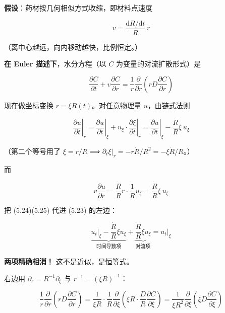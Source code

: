 \textbf{假设}：药材按几何相似方式收缩，即材料点速度


\begin{equation}
v=\frac{\mathrm{d} R/\mathrm{d} t}{R}\,r\tag{5.22}
\end{equation}


（离中心越远，向内移动越快，比例恒定。）


\textbf{在 Euler 描述下}，水分方程（以 $C$ 为变量的对流扩散形式）是


\begin{equation}
\frac{\partial C}{\partial t}+v\frac{\partial C}{\partial r}=\frac1r\frac{\partial}{\partial r}\left(rD\frac{\partial C}{\partial r}\right)\tag{5.23}
\end{equation}


现在做坐标变换 $r=\xi R(t)$。对任意物理量 $u$，由链式法则


\begin{equation}
\left.\frac{\partial u}{\partial t}\right|_{r}
=\left.\frac{\partial u}{\partial t}\right|_{\xi}+u_\xi\cdot\left.\frac{\partial \xi}{\partial t}\right|_{r}
=\left.\frac{\partial u}{\partial t}\right|_{\xi}-\frac{\dot R}{R}\xi\,u_\xi\tag{5.24}
\end{equation}


（第二个等号用了 $\xi=r/R$ ⟹ $\partial_t\xi|_r=-r\dot R/R^2=-\xi\dot R/R$。）


而


\begin{equation}
v\frac{\partial u}{\partial r}=\frac{\dot R}{R}r\cdot\frac{1}{R}u_\xi=\frac{\dot R}{R}\xi\,u_\xi\tag{5.25}
\end{equation}


把 (5.24)(5.25) 代进 (5.23) 的左边：


\begin{equation}
\underbrace{\left.u_t\right|_\xi-\frac{\dot R}{R}\xi u_\xi}_{\text{时间导数项}}+\underbrace{\frac{\dot R}{R}\xi u_\xi}_{\text{对流项}}=\left.u_t\right|_{\xi}\tag{5.26}
\end{equation}


\textbf{两项精确相消！} 这不是近似，是恒等式。


右边用 $\partial_r=R^{-1}\partial_\xi$ 与 $r^{-1}=(\xi R)^{-1}$：


\begin{equation}
\frac1r\frac{\partial}{\partial r}\left(rD\frac{\partial C}{\partial r}\right)
=\frac{1}{\xi R}\cdot\frac1R\frac{\partial}{\partial\xi}\left(\xi R\cdot\frac DR\frac{\partial C}{\partial\xi}\right)
=\frac{1}{\xi R^2}\frac{\partial}{\partial\xi}\left(\xi D\frac{\partial C}{\partial\xi}\right)\tag{5.27}
\end{equation}


